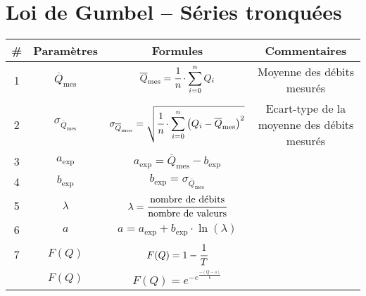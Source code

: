 \section{Loi de Gumbel -- Séries tronquées}
\begin{table}[H]
    \centering
    \begin{tabular}{c|cc|c}
        \# & \textbf{Paramètres}                & \textbf{Formules}                                                                                                                         & \textbf{Commentaires}      \\
        \hline
        1  & $\overline{Q}_\text{mes}$          & $\overline{Q}_\text{mes} = \cfrac{1}{n} \cdot \displaystyle{\sum_{i=0}^{n} Q_i}$                                                          & Moyenne des débits mesurés \\
        \hline
        2  & $\sigma_{\overline{Q}_\text{mes}}$ & $\sigma_{\overline{Q}_\text{mes}} = \sqrt{\cfrac{1}{n} \cdot \displaystyle{\sum_{i=0}^{n} \left(Q_i - \overline{Q}_\text{mes}\right)^2}}$ & Ecart-type de la moyenne des débits mesurés \\
        \hline
        3  & $a_\text{exp}$                     & $a_\text{exp} = \overline{Q}_\text{mes} - b_\text{exp}$                                                                                   & \\
        \hline
        4  & $b_\text{exp}$                     & $b_\text{exp} = \sigma_{\overline{Q}_\text{mes}}$                                                                                         & \\
        \hline
        5  & $\lambda$                          & $\lambda = \cfrac{\text{nombre de débits}}{\text{nombre de valeurs}}$                                                                     & \\                                               
        \hline
        6  & $a$                                & $a = a_\text{exp} + b_\text{exp} \cdot \ln \left(\lambda\right)$                                                                          & \\                                                                                         
        \hline
        7  & $F(Q)$                             & $F(Q) = 1-\cfrac{1}{T}$                                                                                                                   & \\
        \hdashline                   
        8  & $F(Q)$                             & $F(Q) = e^{-e^{\frac{- \left(Q-a\right)}{b}}}$                                                                                            & \\

\end{tabular}
\end{table}
